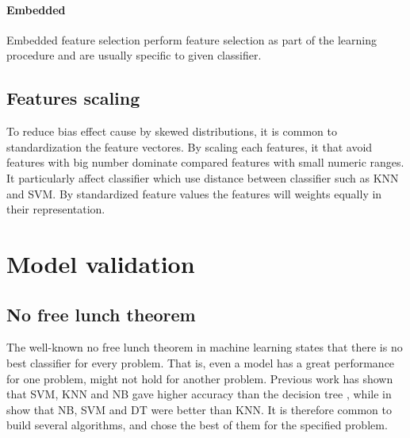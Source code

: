 \documentclass[USenglish]{ifimaster}  %
\begin{document}
\paragraph{Embedded}
Embedded feature selection perform feature selection as part of the learning procedure and are usually specific to given classifier.

\subsection{Features scaling}
\label{subsec:scaling}
To reduce bias effect cause by skewed distributions, it is common to standardization the feature vectores. By scaling each features, it that avoid features with big number dominate compared features with small numeric ranges. It particularly affect classifier which use distance between classifier such as KNN and SVM.  By standardized feature values the features will weights equally in their representation.


\section{Model validation}

\subsection{No free lunch theorem}
The well-known no free lunch theorem\cite{NOFREELUNCH} in machine learning states that there is no best classifier for every problem. That is, even a model has a great performance for one problem, might not hold for another problem. Previous work has shown that SVM, KNN and NB gave higher accuracy than the decision tree \cite{DBLP:conf/emcr/WeissFSZ07}, while in \cite{6849778} show that NB, SVM and DT were better than KNN. It is therefore common to build several algorithms, and chose the best of them for the specified problem.
\end{document}
